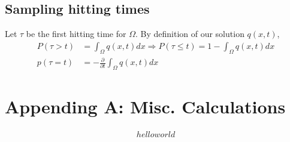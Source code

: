 \documentclass[10pt]{article}
\begin{document}
\subsection{Sampling hitting times}
Let $\tau$ be the first hitting time for $\Omega$. By definition of our solution $q(x,t)$,
\begin{align*}
  P(\tau > t) &= \int_\Omega q(x,t) dx \Rightarrow P(\tau \leq t) = 1 - \int_\Omega q(x,t) dx \\
  p(\tau = t) &= -\frac{\partial}{\partial t}\int_\Omega q(x,t) dx
\end{align*}

\section{Appending A: Misc. Calculations}

\begin{align*}
 hello world
\end{align*}



% 

\end{document}

